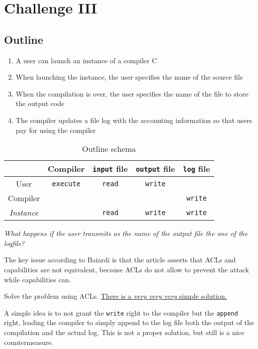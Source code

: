 \chapter{Challenge III}

\section{Outline}
\begin{enumerate}
   \item A user can launch an instance of a compiler C
   \item When launching the instance, the user specifies the name of the
   source file
   \item When the compilation is over, the user specifies the name of the
   file to store the output code
   \item The compiler updates a file log with the accounting information
   so that users pay for using the compiler
\end{enumerate}

\begin{table}[htbp]
   \centering
   \begin{tabular}{c|c|c|c|c|}
      & Compiler & \texttt{input} file & \texttt{output} file &\texttt{log} file\\
      \hline
      User & \texttt{execute} & \texttt{read} & \texttt{write} &\\
      \hline
      Compiler & & & & \texttt{write}\\
      \hline
      \textit{Instance} & & \texttt{read} & \texttt{write} & \texttt{write}\\
   \end{tabular}
   \caption{Outline schema}
   \label{fig:challenge3}
\end{table}
\begin{center}
   \textit{What happens if the user transmits as the name of the output file the one of the logfile?}
\end{center}

The key issue according to Baiardi is that the article asserts that ACLs and capabilities are not equivalent, because ACLs do not allow to prevent the attack while capabilities can.

Solve the problem using ACLs.
\underline{There is a \textit{very very very} simple solution.}

A simple idea is to not grant the \texttt{write} right to the compiler but the \texttt{append} right,
leading the compiler to simply append to the log file both the output of the compilation and the actual log.
This is not a proper solution, but still is a nice countermeasure.
\nl

